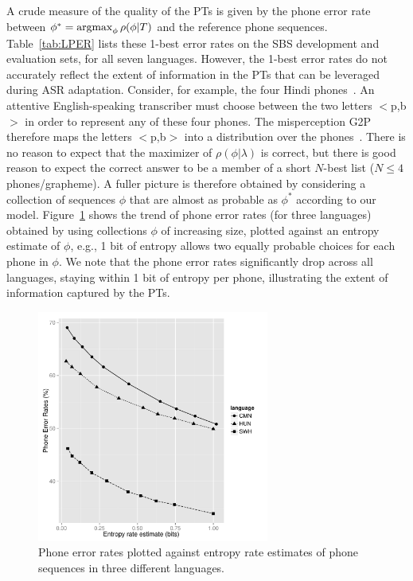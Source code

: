 A crude measure of the quality of the PTs is given by the phone error
rate between $\phi^* = \operatorname*{argmax}_{\phi} \rho(\phi|T)$ and the reference
phone sequences. Table~\ref{tab:LPER} lists these 1-best error rates
on the SBS development and evaluation sets, for all seven
languages. However, the 1-best error rates do not accurately reflect
the extent of information in the PTs that can be leveraged during ASR
adaptation.  Consider, for example, the four Hindi
phones~\ipa{[p,p\textsuperscript{h},b,\"*b]}.  An attentive
English-speaking transcriber must choose between the two letters
$<$p,b$>$ in order to represent any of these four phones.  The
misperception G2P therefore maps the letters $<$p,b$>$ into a
distribution over the phones~\ipa{[p,p\textsuperscript{h},b,\"*b]}.
There is no reason to expect that the maximizer of
$\rho(\phi|\lambda)$ is correct, but there is good reason to expect
the correct answer to be a member of a short $N$-best list ($N\le 4$
phones/grapheme).  A fuller picture is therefore obtained by
considering a collection of sequences $\phi$ that are almost as
probable as $\phi^*$ according to our model. Figure~\ref{fig:listPER}
shows the trend of phone error rates (for three languages) obtained by
using collections $\phi$ of increasing size, plotted against an
entropy estimate of $\phi$, e.g., 1 bit of entropy allows two equally
probable choices for each phone in $\phi$. We note that the phone
error rates significantly drop across all languages, staying within 1
bit of entropy per phone, illustrating the extent of information
captured by the PTs.

\begin{figure}[t!]
\begin{center}
\includegraphics[width=3in]{../figs/perfig.pdf}
\end{center}
\caption{Phone error rates plotted against entropy rate estimates of phone sequences in three different languages.}
\label{fig:listPER}
\end{figure}
